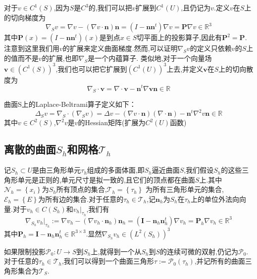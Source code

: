 \documentclass{article}
\begin{document}
对于$v\in C^1(S)$,因为$S$是$C^3$的,我们可以把$v$扩展到$C^1(U)$,且仍记为$v$.定义$v$在$S$上的切向梯度为
\begin{equation*}
\nabla_Sv=\nabla v-(\nabla v\cdot\boldsymbol{n})\boldsymbol{n}=(I-\boldsymbol{n}\boldsymbol{n}^t)\nabla v=\boldsymbol{P}\nabla v\in\mathbb{R}^3
\end{equation*}
其中$\boldsymbol{P}(x)=(I-\boldsymbol{n}\boldsymbol{n}^t)(x)$是到点$x\in S$切平面上的投影算子,因此有$\boldsymbol{P}^2=\boldsymbol{P}$.注意到这里我们用$v$的扩展来定义曲面梯度.然而,可以证明$\nabla_Sv$的定义只依赖$v$的$S$上的值而不是$v$的扩展,也即$\nabla_S$是一个内蕴算子.
\newpage
类似地,对于一个向量场$\boldsymbol{v}\in(C^1(S))^3$,我们也可以把它扩展到$(C^1(U))^3$上去,并定义$\boldsymbol{v}$在$S$上的切向散度为
\begin{equation*}
\nabla_S\cdot\boldsymbol{v}=\nabla\cdot\boldsymbol{v}-\boldsymbol{n}^t\nabla\boldsymbol{v}\boldsymbol{n}\in\mathbb{R}
\end{equation*}

曲面S上的Laplace-Beltrami算子定义如下：
\begin{equation*}
\Delta_Sv=\nabla_S\cdot(\nabla_Sv)=\Delta v-(\nabla v\cdot\boldsymbol{n})(\nabla\cdot\boldsymbol{n})-\boldsymbol{n}^t\nabla^2v\boldsymbol{n}\in\mathbb{R}
\end{equation*}
其中$v\in C^2(S)$,$\nabla^2v$是$v$的Hessian矩阵(扩展为$C^2(U)$函数)
\subsection{离散的曲面$S_h$和网格$\mathcal{T}_h$}
记$S_h\subset U$是由三角形单元$\tau_h$组成的多面体面,即$S_h$逼近曲面$S$,我们假设$S_h$的这些三角形单元是正则的,单元尺寸是拟一致的,且它们的顶点都在曲面$S$上.其中$\mathcal{N}_h=\left\{x_i\right\}$为$S_h$所有顶点的集合,$\mathcal{T}_h=\left\{\tau_h\right\}$ 为所有三角形单元的集合,$\mathcal{E}_h=\left\{E\right\}$为所有边的集合.对于任意的$\tau_h\in\mathcal{T}_h$,记$\boldsymbol{n}_h$为$S_h$在$\tau_h$上的单位外法向向量.对于$v_h\in C(S_h)$和$v_h|_{\tau_h}$,我们有
\begin{equation*}
\nabla_{S_h}v_h|_{\tau_h}:=\nabla v_h-(\nabla v_h\cdot\boldsymbol{n}_h)\boldsymbol{n}_h=(\boldsymbol{I}-\boldsymbol{n}_h\boldsymbol{n}^t_h)\nabla v_h=\boldsymbol{P}_h\nabla v_h\in\mathbb{R}^3
\end{equation*}
其中$\boldsymbol{P}_h=\boldsymbol{I}-\boldsymbol{n}_h\boldsymbol{n}^t_h\in\mathbb{R}^{3\times 3}$.显然$\nabla_{S_h}v_h\in(L^2(S_h))^3$

如果限制投影$\mathcal{P}_0:U\rightarrow S$到$S_h$上,就得到一个从$S_h$到$S$的连续可微的双射,仍记为$\mathcal{P}_0$.对于任意的$\tau_h\in\mathcal{T}_h$,我们可以得到一个曲面三角形$\tau:=\mathcal{P}_0(\tau_h)$,并记所有的曲面三角形集合为$\mathcal{T}_S$.
\end{document}
